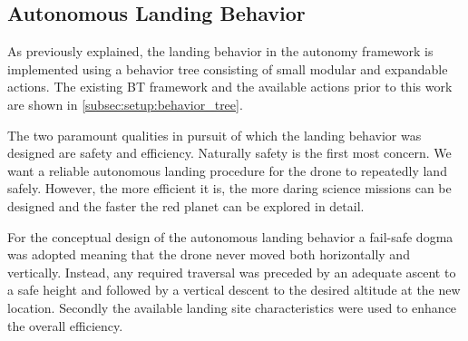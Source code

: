 \subsection{Autonomous Landing Behavior}

As previously explained, the landing behavior in the autonomy framework is implemented using a behavior tree consisting of small modular and expandable actions. The existing BT framework and the available actions prior to this work are shown in \cref{subsec:setup:behavior_tree}.

The two paramount qualities in pursuit of which the landing behavior was designed are safety and efficiency. Naturally safety is the first most concern. We want a reliable autonomous landing procedure for the drone to repeatedly land safely. However, the more efficient it is, the more daring science missions can be designed and the faster the red planet can be explored in detail.

For the conceptual design of the autonomous landing behavior a fail-safe dogma was adopted meaning that the drone never moved both horizontally and vertically. Instead, any required traversal was preceded by an adequate ascent to a safe height and followed by a vertical descent to the desired altitude at the new location. Secondly the available landing site characteristics were used to enhance the overall efficiency. 




